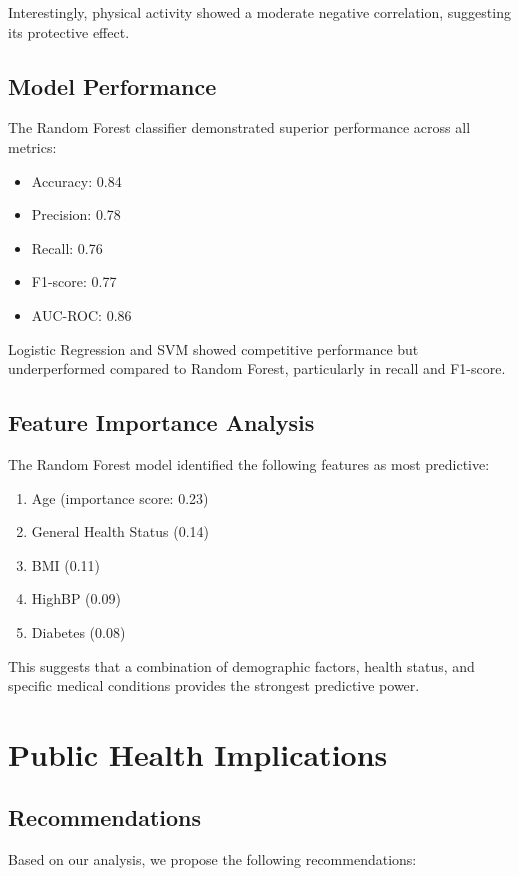 \documentclass[conference]{IEEEtran}
\begin{document}
Interestingly, physical activity showed a moderate negative correlation, suggesting its protective effect.

\subsection{Model Performance}
The Random Forest classifier demonstrated superior performance across all metrics:
\begin{itemize}
    \item Accuracy: 0.84
    \item Precision: 0.78
    \item Recall: 0.76
    \item F1-score: 0.77
    \item AUC-ROC: 0.86
\end{itemize}

Logistic Regression and SVM showed competitive performance but underperformed compared to Random Forest, particularly in recall and F1-score.

\subsection{Feature Importance Analysis}
The Random Forest model identified the following features as most predictive:
\begin{enumerate}
    \item Age (importance score: 0.23)
    \item General Health Status (0.14)
    \item BMI (0.11)
    \item HighBP (0.09)
    \item Diabetes (0.08)
\end{enumerate}

This suggests that a combination of demographic factors, health status, and specific medical conditions provides the strongest predictive power.

\section{Public Health Implications}

\subsection{Recommendations}
Based on our analysis, we propose the following recommendations:
\end{document}
